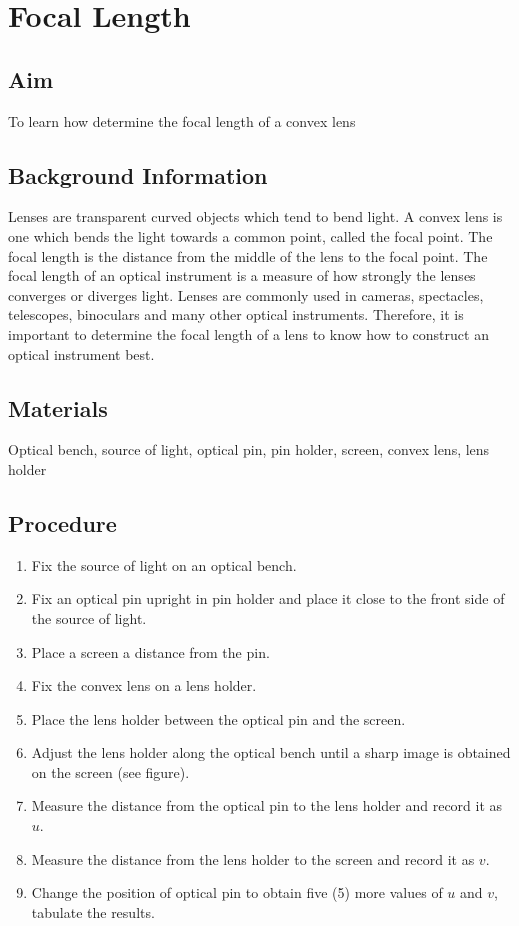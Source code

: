 \chapter{Focal Length}

\section{Aim}
To learn how determine the focal length of a convex lens

\section{Background Information}
Lenses are transparent curved objects which tend to bend light. A convex lens is one which bends the light towards a common point, called the focal point. The focal length is the distance from the middle of the lens to the focal point. The focal length of an optical instrument is a measure of how strongly the lenses converges or diverges light. Lenses are commonly used in cameras, spectacles, telescopes, binoculars and many other optical instruments. Therefore, it is important to determine the focal length of a lens to know how to construct an optical instrument best.

\section{Materials}
Optical bench, source of light, optical pin, pin holder, screen, convex lens, lens holder

\section{Procedure}
\begin{enumerate}
\item Fix the source of light on an optical bench.
\item Fix an optical pin upright in pin holder and place it close to the front side of the source of light.
\item Place a screen a distance from the pin.
\item Fix the convex lens on a lens holder.
\item Place the lens holder between the optical pin and the screen.
\item Adjust the lens holder along the optical bench until a sharp image is obtained on the screen (see figure).
\item Measure the distance from the optical pin to the lens holder and record it as $u$.
\item Measure the distance from the lens holder to the screen and record it as $v$.
\item Change the position of optical pin to obtain five (5) more values of $u$ and $v$, tabulate the results.
\end{enumerate}

